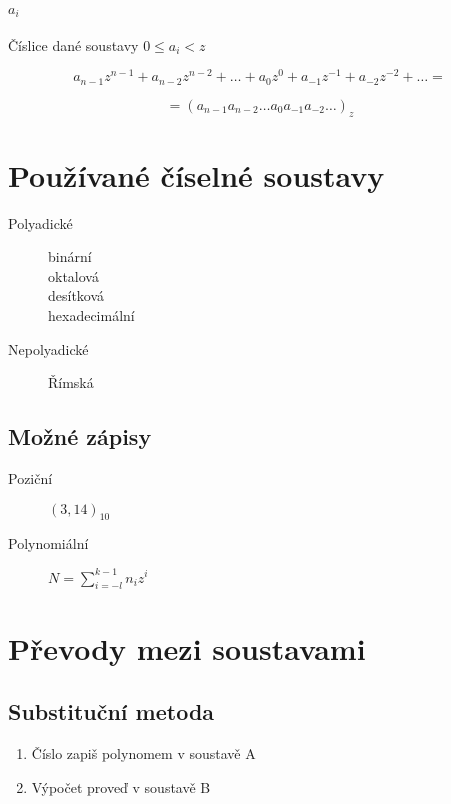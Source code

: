 \documentclass[a4paper, 11pt]{report}
\begin{document}
\paragraph{$a_i$} Číslice dané soustavy $ 0 \le a_i < z$

$$a_{n-1}z^{n-1} + a_{n-2} z^{n-2} + \dots + a_0 z^0 + a_{-1} z^{-1} + a_{-2} z^{-2} + \dots =$$

$$ = (a_{n-1} a_{n-2}  \dots a_0 a_{-1} a_{-2} \dots)_z$$

\section{Používané číselné soustavy}

\begin{description}
	\item[Polyadické] \hfill
	\begin{description}
		\item[binární]
		\item[oktalová]
		\item[desítková]
		\item[hexadecimální]
	\end{description}
	
	\item[Nepolyadické] \hfill
	\begin{description}
		\item[Římská]
	\end{description}	
\end{description}

\subsection{Možné zápisy}
\begin{description}
	\item[Poziční] $(3,14)_{10}$
	\item[Polynomiální] $N =  \sum_{i=-l}^{k-1} n_i z^i$
\end{description}

\section{Převody mezi soustavami}

\subsection{Substituční metoda}

\begin{enumerate}
	\item Číslo zapiš polynomem  v soustavě A
	\item Výpočet proveď v soustavě B
\end{enumerate}
\end{document}
